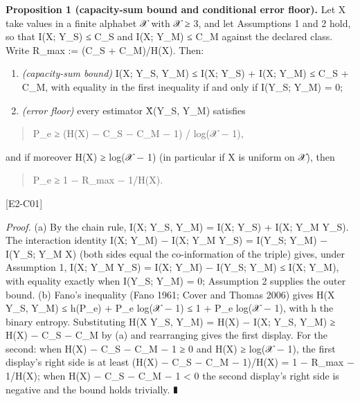 \documentclass[
  11pt,
]{article}
\begin{document}
\textbf{Proposition 1 (capacity-sum bound and conditional error floor).}
Let X take values in a finite alphabet 𝒳 with \textbar 𝒳\textbar{} ≥ 3,
and let Assumptions 1 and 2 hold, so that I(X; Y\_S) ≤ C\_S and I(X;
Y\_M) ≤ C\_M against the declared class. Write R\_max := (C\_S +
C\_M)/H(X). Then:

\begin{enumerate}
\def\labelenumi{(\alph{enumi})}
\item
  \emph{(capacity-sum bound)} I(X; Y\_S, Y\_M) ≤ I(X; Y\_S) + I(X; Y\_M)
  ≤ C\_S + C\_M, with equality in the first inequality if and only if
  I(Y\_S; Y\_M) = 0;
\item
  \emph{(error floor)} every estimator X̂(Y\_S, Y\_M) satisfies
\end{enumerate}

\begin{quote}
P\_e ≥ (H(X) − C\_S − C\_M − 1) / log(\textbar 𝒳\textbar{} − 1),
\end{quote}

and if moreover H(X) ≥ log(\textbar 𝒳\textbar{} − 1) (in particular if X
is uniform on 𝒳), then

\begin{quote}
P\_e ≥ 1 − R\_max − 1/H(X).
\end{quote}

{[}E2-C01{]}

\emph{Proof.} (a) By the chain rule, I(X; Y\_S, Y\_M) = I(X; Y\_S) +
I(X; Y\_M \textbar{} Y\_S). The interaction identity I(X; Y\_M) − I(X;
Y\_M \textbar{} Y\_S) = I(Y\_S; Y\_M) − I(Y\_S; Y\_M \textbar{} X) (both
sides equal the co-information of the triple) gives, under Assumption 1,
I(X; Y\_M \textbar{} Y\_S) = I(X; Y\_M) − I(Y\_S; Y\_M) ≤ I(X; Y\_M),
with equality exactly when I(Y\_S; Y\_M) = 0; Assumption 2 supplies the
outer bound. (b) Fano's inequality (Fano 1961; Cover and Thomas 2006)
gives H(X \textbar{} Y\_S, Y\_M) ≤ h(P\_e) + P\_e
log(\textbar 𝒳\textbar{} − 1) ≤ 1 + P\_e log(\textbar 𝒳\textbar{} − 1),
with h the binary entropy. Substituting H(X \textbar{} Y\_S, Y\_M) =
H(X) − I(X; Y\_S, Y\_M) ≥ H(X) − C\_S − C\_M by (a) and rearranging
gives the first display. For the second: when H(X) − C\_S − C\_M − 1 ≥ 0
and H(X) ≥ log(\textbar 𝒳\textbar{} − 1), the first display's right side
is at least (H(X) − C\_S − C\_M − 1)/H(X) = 1 − R\_max − 1/H(X); when
H(X) − C\_S − C\_M − 1 \textless{} 0 the second display's right side is
negative and the bound holds trivially. ∎
\end{document}
